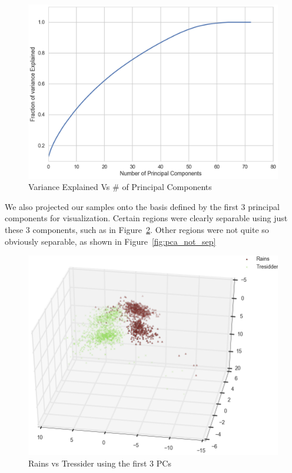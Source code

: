 \documentclass[journal]{IEEEtran}
\begin{document}
\begin{figure}[H]
\centering
\includegraphics[width=0.9\linewidth]{pca_var}
\caption{Variance Explained Vs \# of Principal Components}
\label{fig:pca_var}
\end{figure}

We also projected our samples onto the basis defined by the first 3 principal components for visualization. Certain regions were clearly separable using just these 3 components, such as in Figure~\ref{fig:pca_sep}. Other regions were not quite so obviously separable, as shown in Figure~\ref{fig:pca_not_sep}

\begin{figure}[H]
\centering
\includegraphics[width=0.9\linewidth]{pca_rains_tressider}
\caption{Rains vs Tressider using the first 3 PCs}
\label{fig:pca_sep}
\end{figure}
\end{document}

